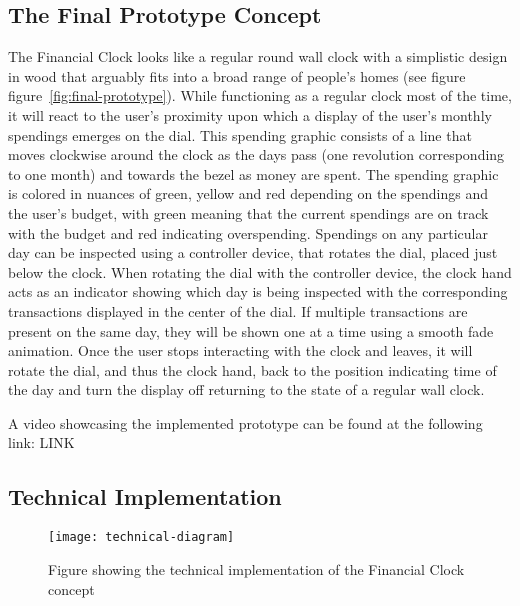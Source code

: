 \subsection{The Final Prototype Concept}
The Financial Clock looks like a regular round wall clock with a simplistic design in wood that arguably fits into a broad range of people’s homes (see figure figure~\ref{fig:final-prototype}). While functioning as a regular clock most of the time, it will react to the user’s proximity upon which a display of the user’s monthly spendings emerges on the dial. This spending graphic consists of a line that moves clockwise around the clock as the days pass (one revolution corresponding to one month) and towards the bezel as money are spent. The spending graphic is colored in nuances of green, yellow and red depending on the spendings and the user’s budget, with green meaning that the current spendings are on track with the budget and red indicating overspending. Spendings on any particular day can be inspected using a controller device, that rotates the dial, placed just below the clock. When rotating the dial with the controller device, the clock hand acts as an indicator showing which day is being inspected with the corresponding transactions displayed in the center of the dial. If multiple transactions are present on the same day, they will be shown one at a time using a smooth fade animation. Once the user stops interacting with the clock and leaves, it will rotate the dial, and thus the clock hand, back to the position indicating time of the day and turn the display off returning to the state of a regular wall clock.

A video showcasing the implemented prototype can be found at the following link: LINK

\subsection{Technical Implementation}

\begin{figure}[h]
	\centering
	\texttt{[image: technical-diagram]}
	\caption{Figure showing the technical implementation of the Financial Clock concept}
	\label{fig:technical-diagram}
\end{figure}

